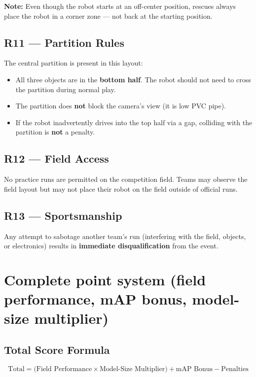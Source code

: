 \documentclass[a4]{article}
\begin{document}
\textbf{Note:} Even though the robot starts at an off-center position, rescues always place the robot in a corner zone --- not back at the starting position.

\subsection*{R11 --- Partition Rules}
The central partition is present in this layout:
\begin{itemize}
    \item All three objects are in the \textbf{bottom half}. The robot should not need to cross the partition during normal play.
    \item The partition does \textbf{not} block the camera's view (it is low PVC pipe).
    \item If the robot inadvertently drives into the top half via a gap, colliding with the partition is \textbf{not} a penalty.
\end{itemize}

\subsection*{R12 --- Field Access}
No practice runs are permitted on the competition field. Teams may observe the field layout but may not place their robot on the field outside of official runs.

\subsection*{R13 --- Sportsmanship}
Any attempt to sabotage another team's run (interfering with the field, objects, or electronics) results in \textbf{immediate disqualification} from the event.

\section*{Complete point system (field performance, mAP bonus, model-size multiplier)}
\subsection*{Total Score Formula}

\begin{equation*}
\boxed{\text{Total} = \bigl(\text{Field Performance} \times \text{Model-Size Multiplier}\bigr) + \text{mAP Bonus} - \text{Penalties}}
\end{equation*}
\end{document}
